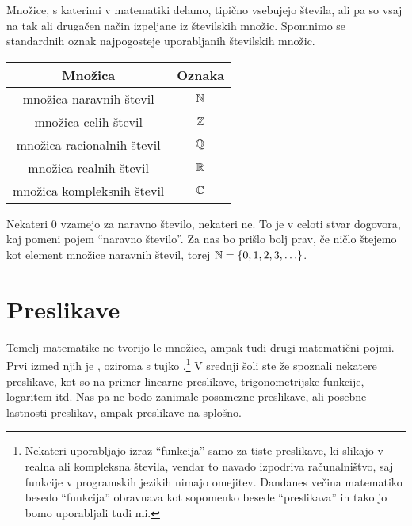 
Množice, s katerimi v matematiki delamo, tipično vsebujejo števila, ali pa so vsaj na tak ali drugačen način izpeljane iz številskih množic. Spomnimo se standardnih oznak najpogosteje uporabljanih številskih množic.
\begin{center}
\begin{tabular}{|cc|}
\hline
\textbf{Množica} & \textbf{Oznaka} \\
\hline
množica naravnih števil & $\mathbb{N}$ \\
množica celih števil & $\mathbb{Z}$ \\
množica racionalnih števil & $\mathbb{Q}$ \\
množica realnih števil & $\mathbb{R}$ \\
množica kompleksnih števil & $\mathbb{C}$ \\
\hline
\end{tabular}
\end{center}

Nekateri $0$ vzamejo za naravno število, nekateri ne. To je v celoti stvar dogovora, kaj pomeni pojem ``naravno število''. Za nas bo prišlo bolj prav, če ničlo štejemo kot element množice naravnih števil, torej $\NN = \set{0, 1, 2, 3, \ldots}$.

\section{Preslikave}

Temelj matematike ne tvorijo le množice, ampak tudi drugi matematični pojmi. Prvi izmed
njih je , oziroma s tujko .\footnote{Nekateri uporabljajo
  izraz ``funkcija'' samo za tiste preslikave, ki slikajo v realna ali kompleksna števila,
  vendar to navado izpodriva računalništvo, saj funkcije v programskih jezikih nimajo
  omejitev. Dandanes večina matematiko besedo ``funkcija'' obravnava kot sopomenko besede
  ``preslikava'' in tako jo bomo uporabljali tudi mi.} V srednji šoli ste že spoznali
nekatere preslikave, kot so na primer linearne preslikave, trigonometrijske funkcije,
logaritem itd. Nas pa ne bodo zanimale posamezne preslikave, ali posebne lastnosti
preslikav, ampak preslikave na splošno.

